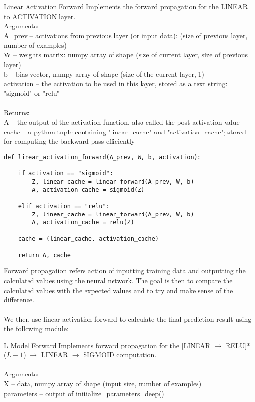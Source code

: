 \documentclass[a4paper]{article}
\begin{document}
\begin{enumerate}
\begin{alg}{Linear Activation Forward}{} Implements the forward propagation for the LINEAR to ACTIVATION layer. \\
Arguments: \\
A\_prev -- activations from previous layer (or input data): (size of previous layer, number of examples)\\
W -- weights matrix: numpy array of shape (size of current layer, size of previous layer)\\
b -- bias vector, numpy array of shape (size of the current layer, 1)\\
activation -- the activation to be used in this layer, stored as a text string: "sigmoid" or "relu"\\~\\
Returns:\\
A -- the output of the activation function, also called the post-activation value \\
cache -- a python tuple containing "linear\_cache" and "activation\_cache"; stored for computing the backward pass efficiently\\
\begin{verbatim}
def linear_activation_forward(A_prev, W, b, activation):

    if activation == "sigmoid":
        Z, linear_cache = linear_forward(A_prev, W, b)
        A, activation_cache = sigmoid(Z)
        
    elif activation == "relu":
        Z, linear_cache = linear_forward(A_prev, W, b)
        A, activation_cache = relu(Z) 
        
    cache = (linear_cache, activation_cache)

    return A, cache
\end{verbatim}
\end{alg}

Forward propagation refers action of inputting training data and outputting the calculated values using the neural network. The goal is then to compare the calculated values with the expected values and to try and make sense of the difference. \\~\\

We then use linear activation forward to calculate the final prediction result using the following module: 

\begin{alg}{L Model Forward}{} Implements forward propagation for the [LINEAR $\to$ RELU]*($L-1$) $\to$ LINEAR $\to$ SIGMOID computation. \\~\\
Arguments:\\
X -- data, numpy array of shape (input size, number of examples)\\
parameters -- output of initialize\_parameters\_deep()\\~\\


\end{alg}
\end{enumerate}
\end{document}
